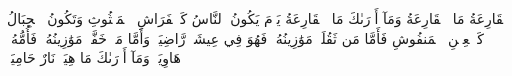 ٱلۡقَارِعَةُ
مَا ٱلۡقَارِعَةُ
وَمَآ أَدۡرَىٰكَ مَا ٱلۡقَارِعَةُ
يَوۡمَ يَكُونُ ٱلنَّاسُ كَٱلۡفَرَاشِ ٱلۡمَبۡثُوثِ
وَتَكُونُ ٱلۡجِبَالُ كَٱلۡعِهۡنِ ٱلۡمَنفُوشِ
فَأَمَّا مَن ثَقُلَتۡ مَوَٰزِينُهُۥ
فَهُوَ فِي عِيشَةٖ رَّاضِيَةٖ
وَأَمَّا مَنۡ خَفَّتۡ مَوَٰزِينُهُۥ
فَأُمُّهُۥ هَاوِيَةٞ
وَمَآ أَدۡرَىٰكَ مَا هِيَهۡ
نَارٌ حَامِيَةُۢ
